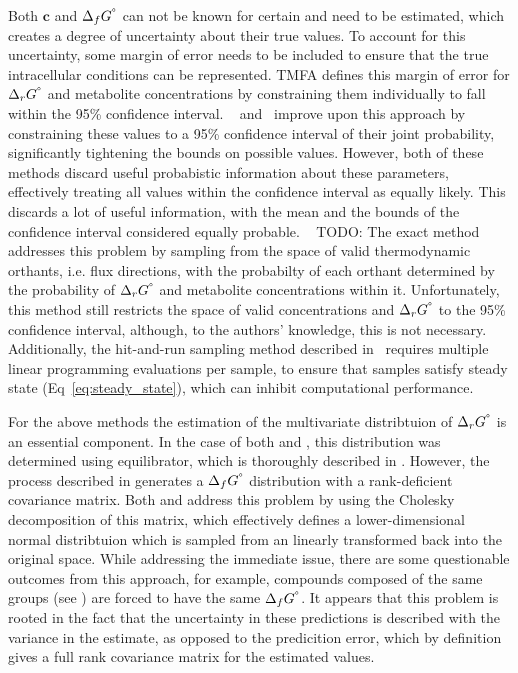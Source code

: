 \documentclass[10pt,letterpaper]{article}
\newcommand{\sdgf}{\Delta_fG^{\degree}}
\newcommand{\sdgr}{\Delta_rG^{\degree}}
\begin{document}
Both $\mathbf{c}$ and $\sdgf$ can not be known for certain and need to be estimated, which creates a degree of uncertainty about their true values.
To account for this uncertainty, some margin of error needs to be included to ensure that the true intracellular conditions can be represented.
TMFA \cite{HENRY_2007_tmfa} defines this margin of error for $\sdgr$ and metabolite concentrations by constraining them individually to fall within the 95\% confidence interval.
~\cite{multiTFA} and~\cite{PTA} improve upon this approach by constraining these values to a 95\% confidence interval of their joint probability, significantly tightening the bounds on possible values.
However, both of these methods discard useful probabistic information about these parameters, effectively treating all values within the confidence interval as equally likely.
This discards a lot of useful information, with the mean and the bounds of the confidence interval considered equally probable.
~\cite{PTA} {TODO: The exact method} addresses this problem by sampling from the space of valid thermodynamic orthants, i.e. flux directions, with the probabilty of each orthant determined by the probability of $\sdgr$ and metabolite concentrations within it.
Unfortunately, this method still restricts the space of valid concentrations and $\sdgr$ to the 95\% confidence interval, although, to the authors' knowledge, this is not necessary.
Additionally, the hit-and-run sampling method described in~\cite{PTA} requires multiple linear programming evaluations per sample, to ensure that samples satisfy steady state (Eq~\ref{eq:steady_state}), which can inhibit computational performance.

For the above methods the estimation of the multivariate distribtuion of $\sdgr$ is an essential component.
In the case of both \cite{PTA} and \cite{multiTFA}, this distribution was determined using equilibrator, which is thoroughly described in \cite{equilibrator_3_beber_noor}.
However, the process described in \cite{equilibrator_3_beber_noor} generates a $\sdgf$ distribution with a rank-deficient covariance matrix.
Both \cite{PTA} and \cite{multiTFA} address this problem by using the Cholesky decomposition of this matrix, which effectively defines a lower-dimensional normal distribtuion which is sampled from an linearly transformed back into the original space.
While addressing the immediate issue, there are some questionable outcomes from this approach, for example, compounds composed of the same groups (see \cite{JANKOWSKI_2008_group_contribution}) are forced to have the same $\sdgf$.
It appears that this problem is rooted in the fact that the uncertainty in these predictions is described with the variance in the estimate, as opposed to the predicition error, which by definition gives a full rank covariance matrix for the estimated values.
\end{document}
